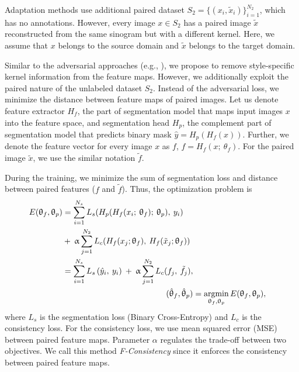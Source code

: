 Adaptation methods use additional paired dataset $S_2 = \{ ( x_i, \tilde{x}_i ) \}_{i=1}^{N_2}$, which has no annotations. However, every image $x \in S_2$ has a paired image $\tilde{x}$ reconstructed from the same sinogram but with a different kernel. Here, we assume that $x$ belongs to the source domain and $\tilde{x}$ belongs to the target domain.

Similar to the adversarial approaches (e.g., \cite{ganin2015unsupervised}), we propose to remove style-specific kernel information from the feature maps. However, we additionally exploit the paired nature of the unlabeled dataset $S_2$. Instead of the adversarial loss, we minimize the distance between feature maps of paired images. Let us denote feature extractor $H_f$, the part of segmentation model that maps input images $x$ into the feature space, and segmentation head $H_p$, the complement part of segmentation model that predicts binary mask $\hat{y} = H_p \left( H_f \left( x \right) \right)$. Further, we denote the feature vector for every image $x$ as $f$, $f = H_f (x; \: \theta_f)$. For the paired image $\tilde{x}$, we use the similar notation $\tilde{f}$.%

During the training, we minimize the sum of segmentation loss and distance between paired features ($f$ and $\tilde{f}$). Thus, the optimization problem is
\begin{align}
	\label{eq:f-consistency_opt}
	\begin{split}
		E (\uptheta_f, \uptheta_p) &= \sum_{i = 1}^{N_s} L_s (H_p(H_f (x_i; \: \uptheta_f); \: \uptheta_p), \: y_i) \: \\
		& + \: \upalpha \sum_{j = 1}^{N_2} L_c (H_f (x_j; \uptheta_{f}), \: H_f (\tilde{x}_j; \uptheta_f)) \\
		& = \sum_{i = 1}^{N_s} L_s \left(\hat{y}_i ,\: y_i \right) \: + \: \upalpha \sum_{j = 1}^{N_2} L_c (f_j,\: \tilde{f}_j ),  
	\end{split} \\
	(\hat{\uptheta}_f, \hat{\uptheta}_p) & = \operatorname*{argmin}_{\uptheta_f, \uptheta_p} E(\uptheta_f, \uptheta_p),
\end{align}
where $L_s$ is the segmentation loss (Binary Cross-Entropy) and $L_c$ is the consistency loss. For the consistency loss, we use mean squared error (MSE) between paired feature maps. Parameter $\alpha$ regulates the trade-off between two objectives. We call this method \textit{F-Consistency} since it enforces the consistency between paired feature maps.

